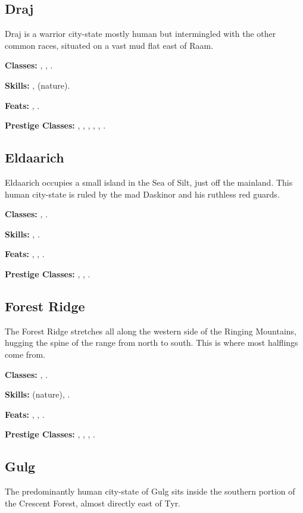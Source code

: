 \subsection{Draj}
Draj is a warrior city-state mostly human but intermingled with the other common races, situated on a vast mud flat east of Raam.

\textbf{Classes:} , , .

\textbf{Skills:} ,  (nature).

\textbf{Feats:} , .

\textbf{Prestige Classes:} , , , , , .

\subsection{Eldaarich}
Eldaarich occupies a small island in the Sea of Silt, just off the mainland. This human city-state is ruled by the mad Daskinor and his ruthless red guards.

\textbf{Classes:} , .

\textbf{Skills:} , .

\textbf{Feats:} , , .

\textbf{Prestige Classes:} , , .


\subsection{Forest Ridge}
The Forest Ridge stretches all along the western side of the Ringing Mountains, hugging the spine of the range from north to south. This is where most halflings come from.

\textbf{Classes:} , .

\textbf{Skills:}  (nature), .

\textbf{Feats:} , , .

\textbf{Prestige Classes:} , , , .


\subsection{Gulg}
The predominantly human city-state of Gulg sits inside the southern portion of the Crescent Forest, almost directly east of Tyr.

